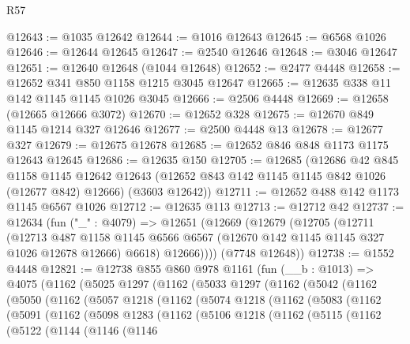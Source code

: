 \begin{lexlean}{R57}
\begin{coremodule}
@12643 := @1035 @12642
@12644 := @1016 @12643
@12645 := @6568 @1026
@12646 := @12644 @12645
@12647 := @2540 @12646
@12648 := @3046 @12647
@12651 := @12640 @12648 (@1044 @12648)
@12652 := @2477 @4448
@12658 := @12652 @341 @850 @1158 @1215 @3045 @12647
@12665 := @12635 @338 @11 @142 @1145 @1145 @1026 @3045
@12666 := @2506 @4448
@12669 := @12658 (@12665 @12666 @3072)
@12670 := @12652 @328
@12675 := @12670 @849 @1145 @1214 @327 @12646
@12677 := @2500 @4448 @13
@12678 := @12677 @327
@12679 := @12675 @12678
@12685 := @12652 @846 @848 @1173 @1175 @12643 @12645
@12686 := @12635 @150
@12705 := @12685
    (@12686
      @42
      @845
      @1158
      @1145
      @12642
      @12643
      (@12652 @843 @142 @1145 @1145 @842 @1026 (@12677 @842) @12666)
      (@3603 @12642))
@12711 := @12652 @488 @142 @1173 @1145 @6567 @1026
@12712 := @12635 @113
@12713 := @12712 @42
@12737 := @12634
    (fun ("_" : @4079) =>
    @12651
      (@12669
        (@12679
          (@12705
            (@12711
              (@12713
                @487
                @1158
                @1145
                @6566
                @6567
                (@12670 @142 @1145 @1145 @327 @1026 @12678 @12666)
                @6618)
              @12666))))
      (@7748 @12648))
@12738 := @1552 @4448
@12821 := @12738
    @855
    @860
    @978
    @1161
    (fun (__b : @1013) =>
    @4075
      (@1162
        (@5025
          @1297
          (@1162
            (@5033
              @1297
              (@1162
                (@5042
                  (@1162
                    (@5050
                      (@1162
                        (@5057
                          @1218
                          (@1162
                            (@5074
                              @1218
                              (@1162
                                (@5083
                                  (@1162
                                    (@5091
                                      (@1162
                                        (@5098
                                          @1283
                                          (@1162
                                            (@5106
                                              @1218
                                              (@1162
                                                (@5115
                                                  (@1162
                                                    (@5122
                                                      (@1144
                                                        (@1146
                                                          (@1146

\end{coremodule}
\end{lexlean}
